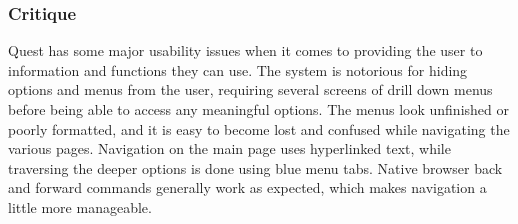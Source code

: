 \documentclass[10pt]{article}
\newenvironment{InlineColumnFigure}
{\par\medskip\noindent\minipage{\linewidth}}
{\endminipage\par\medskip}
\newcommand{\Caption}[1]
{\vspace{-4mm}\fontsize{9}{9}\textbf{Figure \refstepcounter{figCounter} 
\arabic{figCounter}: #1}}
\newcounter{figCounter}
\begin{document}
\begin{multicols}{2}

\subsubsection*{Critique}
Quest has some major usability issues when it comes to providing the user to 
information and functions they can use. The system is notorious for hiding 
options and menus from the user, requiring several screens of drill down menus 
before being able to access any meaningful options. The menus look unfinished or 
poorly formatted, and it is easy to become lost and confused while navigating 
the various pages. Navigation on the main page uses hyperlinked text, 
while traversing the deeper options is done using blue menu tabs. Native browser 
back and forward commands generally work as expected, which makes navigation a 
little more manageable. 


\end{multicols}
%
%
%
\end{document}
